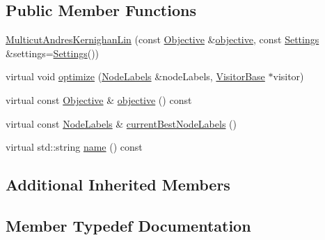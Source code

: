 \subsection*{Public Member Functions}
\begin{DoxyCompactItemize}
\item 
\hyperlink{classnifty_1_1graph_1_1MulticutAndresKernighanLin_a970ce97f0e4324ddf9550e4239603276}{Multicut\+Andres\+Kernighan\+Lin} (const \hyperlink{classnifty_1_1graph_1_1MulticutAndres_af65f82c6d6f78356d08de6728618fc02}{Objective} \&\hyperlink{classnifty_1_1graph_1_1MulticutAndresKernighanLin_a427318d82a5184ffb8e082abcbd49af1}{objective}, const \hyperlink{structnifty_1_1graph_1_1MulticutAndresKernighanLin_1_1Settings}{Settings} \&settings=\hyperlink{structnifty_1_1graph_1_1MulticutAndresKernighanLin_1_1Settings}{Settings}())
\item 
virtual void \hyperlink{classnifty_1_1graph_1_1MulticutAndresKernighanLin_a766757cae5e24f6c3986b929c68658e7}{optimize} (\hyperlink{classnifty_1_1graph_1_1MulticutAndres_a0948881682fa859a4f2b985e0a95b2c7}{Node\+Labels} \&node\+Labels, \hyperlink{classnifty_1_1graph_1_1MulticutAndres_ac07b28fb84cb2202147dd666d5d19c25}{Visitor\+Base} $\ast$visitor)
\item 
virtual const \hyperlink{classnifty_1_1graph_1_1MulticutAndres_af65f82c6d6f78356d08de6728618fc02}{Objective} \& \hyperlink{classnifty_1_1graph_1_1MulticutAndresKernighanLin_a427318d82a5184ffb8e082abcbd49af1}{objective} () const 
\item 
virtual const \hyperlink{classnifty_1_1graph_1_1MulticutAndres_a0948881682fa859a4f2b985e0a95b2c7}{Node\+Labels} \& \hyperlink{classnifty_1_1graph_1_1MulticutAndresKernighanLin_aa7c85612e577e3de12df441c6fbf11f6}{current\+Best\+Node\+Labels} ()
\item 
virtual std\+::string \hyperlink{classnifty_1_1graph_1_1MulticutAndresKernighanLin_ae816619651f3c22e51a4b3e156337450}{name} () const 
\end{DoxyCompactItemize}
\subsection*{Additional Inherited Members}


\subsection{Member Typedef Documentation}
\hypertarget{classnifty_1_1graph_1_1MulticutAndresKernighanLin_afd96990e2ad7afe119cd7a5bc633c0ba}{}
